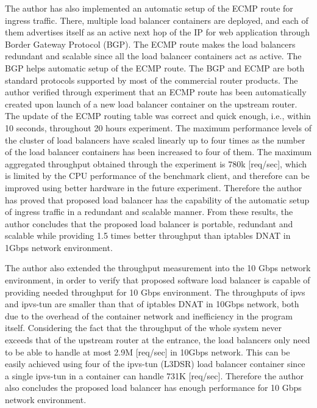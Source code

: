 The author has also implemented an automatic setup of the ECMP route for ingress traffic.
There, multiple load balancer containers are deployed, and each of them advertises itself as an active next hop of the IP for web application through Border Gateway Protocol (BGP).
The ECMP route makes the load balancers redundant and scalable since all the load balancer containers act as active.
%
The BGP helps automatic setup of the ECMP route.  
The BGP and ECMP are both standard protocols supported by most of the commercial router products.
%
The author verified through experiment that an ECMP route has been automatically created upon launch of a new load balancer container on the upstream router.
The update of the ECMP routing table was correct and quick enough, i.e., within 10 seconds, throughout 20 hours experiment.
The maximum performance levels of the cluster of load balancers have scaled linearly up to four times as the number of the load balancer containers has been increased to four of them.
The maximum aggregated throughput obtained through the experiment is 780k [req/sec], which is limited by the CPU performance of the benchmark client, and therefore can be improved using better hardware in the future experiment.
Therefore the author has proved that proposed load balancer has the capability of the automatic setup of ingress traffic in a redundant and scalable manner.
%
From these results, the author concludes that the proposed load balancer is portable, redundant and scalable while providing 1.5 times better throughput than iptables DNAT in 1Gbps network environment.

The author also extended the throughput measurement into the 10 Gbps network environment, in order to verify that proposed software load balancer is capable of providing needed throughput for 10 Gbps environment.
The throughputs of ipvs and ipvs-tun are smaller than that of iptables DNAT in 10Gbps network, both due to the overhead of the container network and inefficiency in the program itself.
Considering the fact that the throughput of the whole system never exceeds that of the upstream router at the entrance, the load balancers only need to be able to handle at most 2.9M [req/sec] in 10Gbps network.
This can be easily achieved using four of the ipvs-tun (L3DSR) load balancer container since a single ipvs-tun in a container can handle 731K [req/sec].
Therefore the author also concludes the proposed load balancer has enough performance for 10 Gbps network environment.

